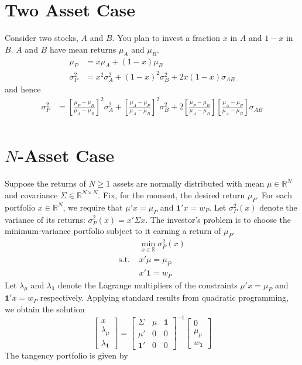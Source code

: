 \documentclass[12pt]{article}
\begin{document}
	\onehalfspacing
\section{Two Asset Case}
	Consider two stocks, $A$ and $B$. You plan to invest a fraction $x$ in $A$ and $1-x$ in $B$. $A$ and $B$ have mean returns $\mu_{A}$ and $\mu_{B}$. 
	\begin{align}
		\mu_{P}&=x\mu_{A}+(1-x)\mu_{B}\\
		\sigma_{P}^{2}&=x^{2}\sigma_{A}^{2}+(1-x)^{2}\sigma_{B}^{2}+2x(1-x)\sigma_{AB}
	\end{align}
	and hence
	\begin{align}
		\sigma_{P}^{2}&=\left[\frac{\mu_{P}-\mu_{B}}{\mu_{A}-\mu_{B}}\right]^{2}\sigma_{A}^{2}+\left[\frac{\mu_{A}-\mu_{P}}{\mu_{A}-\mu_{B}}\right]^{2}\sigma_{B}^{2}+2\left[\frac{\mu_{P}-\mu_{B}}{\mu_{A}-\mu_{B}}\right]\left[\frac{\mu_{A}-\mu_{P}}{\mu_{A}-\mu_{B}}\right]\sigma_{AB}\\
	\end{align}
\section{$N$-Asset Case}
	Suppose the returns of $N\geq1$ assets are normally distributed with mean $\mu\in\mathbb{R}^{N}$ and covariance $\Sigma\in\mathbb{R}^{N\times N}$. Fix, for the moment, the desired return $\mu_{P}$. For each portfolio $x\in\mathbb{R}^{N}$, we require that $\mu'x=\mu_{P}$ and $\mathbf{1}'x=w_{P}$. Let $\sigma_{P}^{2}(x)$ denote the variance of its returns: $\sigma_{P}^{2}(x)=x'\Sigma x$. The investor's problem is to choose the minimum-variance portfolio subject to it earning a return of $\mu_{P}$. 
\begin{equation}
	\begin{array}{rl}
		&\min_{x\in\mathbb{R}}\sigma_{P}^{2}(x)\\
		\text{s.t. }&x'\mu=\mu_{P}\\
		&x'\mathbf{1}=w_{P}
	\end{array}
\end{equation}
Let $\lambda_{\mu}$ and $\lambda_{\mathbf{1}}$ denote the Lagrange multipliers of the constraints $\mu'x=\mu_{P}$ and $\mathbf{1}'x=w_{P}$ respectively. Applying standard results from quadratic programming, we obtain the solution 
\begin{equation}
\left[
\begin{array}{c}
x \\
\lambda_{\mu}\\
\lambda_{\mathbf{1}}
\end{array}
\right]
=
\left[
\begin{array}{ccc}
\Sigma & \mu & \mathbf{1} \\
\mu' & 0 & 0 \\
\mathbf{1}' & 0 & 0
\end{array}
\right]^{-1}
\left[
\begin{array}{c}
0 \\
\mu_{\mu}\\
w_{\mathbf{1}}
\end{array}
\right]
\end{equation}
The tangency portfolio is given by
\end{document}
